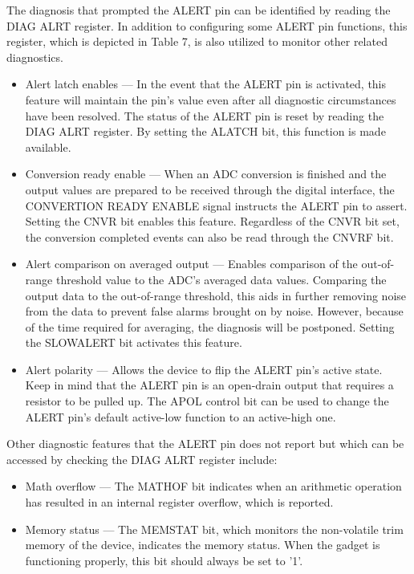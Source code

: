 The diagnosis that prompted the ALERT pin can be identified by reading the DIAG ALRT register. In addition to configuring some ALERT pin functions, this register, which is depicted in Table 7, is also utilized to monitor other related diagnostics.

\begin{itemize}
	\item Alert latch enables — In the event that the ALERT pin is activated, this feature will maintain the pin's value even after all diagnostic circumstances have been resolved. The status of the ALERT pin is reset by reading the DIAG ALRT register. By setting the ALATCH bit, this function is made available.
	\item Conversion ready enable —  When an ADC conversion is finished and the output values are prepared to be received through the digital interface, the CONVERTION READY ENABLE signal instructs the ALERT pin to assert. Setting the CNVR bit enables this feature. Regardless of the CNVR bit set, the conversion completed events can also be read through the CNVRF bit.
	\item Alert comparison on averaged output — Enables comparison of the out-of-range threshold value to the ADC's averaged data values. Comparing the output data to the out-of-range threshold, this aids in further removing noise from the data to prevent false alarms brought on by noise. However, because of the time required for averaging, the diagnosis will be postponed. Setting the SLOWALERT bit activates this feature.
	\item Alert polarity — Allows the device to flip the ALERT pin's active state. Keep in mind that the ALERT pin is an open-drain output that requires a resistor to be pulled up. The APOL control bit can be used to change the ALERT pin's default active-low function to an active-high one.
\end{itemize}

Other diagnostic features that the ALERT pin does not report but which can be accessed by checking the DIAG ALRT register include:

\begin{itemize}
	\item Math overflow — The MATHOF bit indicates when an arithmetic operation has resulted in an internal register overflow, which is reported.
	\item Memory status — The MEMSTAT bit, which monitors the non-volatile trim memory of the device, indicates the memory status. When the gadget is functioning properly, this bit should always be set to '1'.
\end{itemize}

